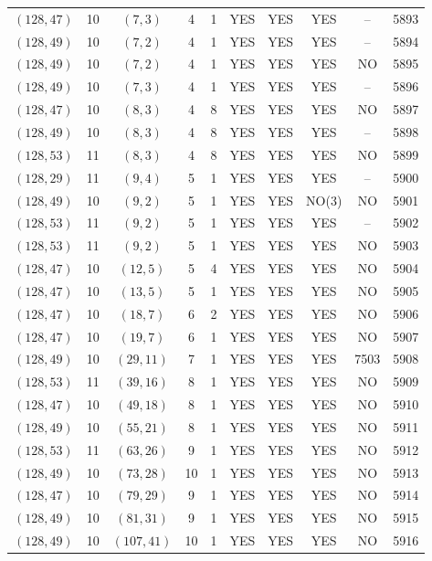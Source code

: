 \begin{longtable}{|c|c|c|c|c|c|c|c|c|c|}
$(128, 47)$ & 10 & $(7, 3)$ & 4 & 1 & YES & YES & YES & -- & 5893\\
$(128, 49)$ & 10 & $(7, 2)$ & 4 & 1 & YES & YES & YES & -- & 5894\\
$(128, 49)$ & 10 & $(7, 2)$ & 4 & 1 & YES & YES & YES & NO & 5895\\
$(128, 49)$ & 10 & $(7, 3)$ & 4 & 1 & YES & YES & YES & -- & 5896\\
$(128, 47)$ & 10 & $(8, 3)$ & 4 & 8 & YES & YES & YES & NO & 5897\\
$(128, 49)$ & 10 & $(8, 3)$ & 4 & 8 & YES & YES & YES & -- & 5898\\
$(128, 53)$ & 11 & $(8, 3)$ & 4 & 8 & YES & YES & YES & NO & 5899\\
$(128, 29)$ & 11 & $(9, 4)$ & 5 & 1 & YES & YES & YES & -- & 5900\\
$(128, 49)$ & 10 & $(9, 2)$ & 5 & 1 & YES & YES & NO(3) & NO & 5901\\
$(128, 53)$ & 11 & $(9, 2)$ & 5 & 1 & YES & YES & YES & -- & 5902\\
$(128, 53)$ & 11 & $(9, 2)$ & 5 & 1 & YES & YES & YES & NO & 5903\\
$(128, 47)$ & 10 & $(12, 5)$ & 5 & 4 & YES & YES & YES & NO & 5904\\
$(128, 47)$ & 10 & $(13, 5)$ & 5 & 1 & YES & YES & YES & NO & 5905\\
$(128, 47)$ & 10 & $(18, 7)$ & 6 & 2 & YES & YES & YES & NO & 5906\\
$(128, 47)$ & 10 & $(19, 7)$ & 6 & 1 & YES & YES & YES & NO & 5907\\
$(128, 49)$ & 10 & $(29, 11)$ & 7 & 1 & YES & YES & YES & 7503 & 5908\\
$(128, 53)$ & 11 & $(39, 16)$ & 8 & 1 & YES & YES & YES & NO & 5909\\
$(128, 47)$ & 10 & $(49, 18)$ & 8 & 1 & YES & YES & YES & NO & 5910\\
$(128, 49)$ & 10 & $(55, 21)$ & 8 & 1 & YES & YES & YES & NO & 5911\\
$(128, 53)$ & 11 & $(63, 26)$ & 9 & 1 & YES & YES & YES & NO & 5912\\
$(128, 49)$ & 10 & $(73, 28)$ & 10 & 1 & YES & YES & YES & NO & 5913\\
$(128, 47)$ & 10 & $(79, 29)$ & 9 & 1 & YES & YES & YES & NO & 5914\\
$(128, 49)$ & 10 & $(81, 31)$ & 9 & 1 & YES & YES & YES & NO & 5915\\
$(128, 49)$ & 10 & $(107, 41)$ & 10 & 1 & YES & YES & YES & NO & 5916\\

\end{longtable}
